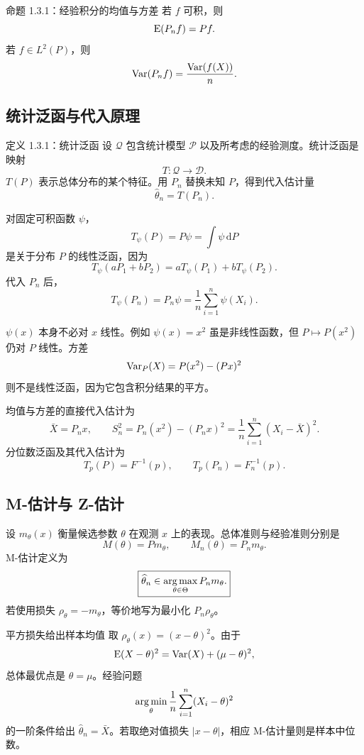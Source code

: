 \begin{definitionbox}{命题 1.3.1：经验积分的均值与方差}
若 $f$ 可积，则
\[
 \operatorname{E}(P_nf)=Pf.
\]
若 $f\in L^2(P)$，则
\[
 \operatorname{Var}(P_nf)=\frac{\operatorname{Var}(f(X))}{n}.
\]
\end{definitionbox}

\subsection{统计泛函与代入原理}

\begin{definitionbox}{定义 1.3.1：统计泛函}
设 $\mathcal Q$ 包含统计模型 $\mathcal P$ 以及所考虑的经验测度。统计泛函是映射
\[
 T:\mathcal Q\to\mathcal D.
\]
$T(P)$ 表示总体分布的某个特征。用 $P_n$ 替换未知 $P$，得到代入估计量
\[
 \boxed{\widehat\theta_n=T(P_n).}
\]
\end{definitionbox}

对固定可积函数 $\psi$，
\[
 T_\psi(P)=P\psi=\int\psi\,\mathrm dP
\]
是关于分布 $P$ 的线性泛函，因为
\[
 T_\psi(aP_1+bP_2)
 =aT_\psi(P_1)+bT_\psi(P_2).
\]
代入 $P_n$ 后，
\[
 T_\psi(P_n)=P_n\psi=\frac1n\sum_{i=1}^n\psi(X_i).
\]

\begin{notebox}[“线性”是对分布而言]
$\psi(x)$ 本身不必对 $x$ 线性。例如 $\psi(x)=x^2$ 虽是非线性函数，但 $P\mapsto P(x^2)$ 仍对 $P$ 线性。方差
\[
 \operatorname{Var}_P(X)=P(x^2)-(Px)^2
\]
则不是线性泛函，因为它包含积分结果的平方。
\end{notebox}

均值与方差的直接代入估计为
\[
 \bar X=P_nx,
 \qquad
 S_n^2=P_n(x^2)-(P_nx)^2
 =\frac1n\sum_{i=1}^n(X_i-\bar X)^2.
\]
分位数泛函及其代入估计为
\[
 T_p(P)=F^{-1}(p),
 \qquad
 T_p(P_n)=F_n^{-1}(p).
\]

\subsection{M-估计与 Z-估计}

设 $m_\theta(x)$ 衡量候选参数 $\theta$ 在观测 $x$ 上的表现。总体准则与经验准则分别是
\[
 M(\theta)=Pm_\theta,
 \qquad
 M_n(\theta)=P_nm_\theta.
\]
M-估计定义为
\[
 \boxed{
 \widehat\theta_n\in\operatorname*{arg\,max}_{\theta\in\Theta}P_nm_\theta.}
\]
若使用损失 $\rho_\theta=-m_\theta$，等价地写为最小化 $P_n\rho_\theta$。

\begin{examplebox}{平方损失给出样本均值}
取 $\rho_\theta(x)=(x-\theta)^2$。由于
\[
 \operatorname{E}(X-\theta)^2=\operatorname{Var}(X)+(\mu-\theta)^2,
\]
总体最优点是 $\theta=\mu$。经验问题
\[
 \operatorname*{arg\,min}_\theta\frac1n\sum_{i=1}^n(X_i-\theta)^2
\]
的一阶条件给出 $\widehat\theta_n=\bar X$。若取绝对值损失 $|x-\theta|$，相应 M-估计量则是样本中位数。
\end{examplebox}

